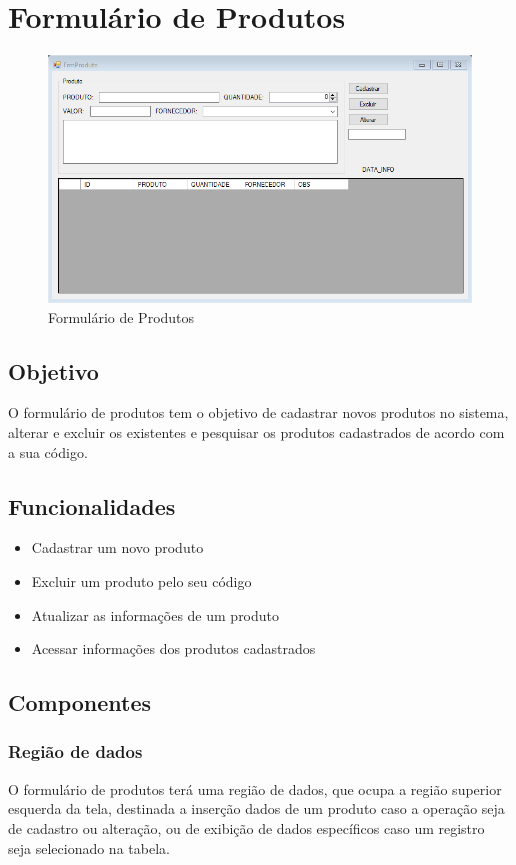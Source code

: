 \documentclass[
	article,			%
	12pt,				%
	oneside,			%
	a4paper,			%
	english,			%
	brazil,				%
	sumario=tradicional
	]{abntex2}
\begin{document}
	\section{Formulário de Produtos}
		\begin{figure}[!htb]
			\centering
			\includegraphics[scale=0.7]{./Figuras/FrmProduto.png}
			\caption{Formulário de Produtos}
		\end{figure}
		\subsection{Objetivo}
		O formulário de produtos tem o objetivo de cadastrar novos produtos no sistema, alterar e excluir os existentes e pesquisar os produtos cadastrados de acordo com a sua código.
		\subsection{Funcionalidades}
			\begin{itemize}
				\item Cadastrar um novo produto
				\item Excluir um produto pelo seu código
				\item Atualizar as informações de um produto
				\item Acessar informações dos produtos cadastrados
			\end{itemize}
		\subsection{Componentes}
			\subsubsection{Região de dados}
			O formulário de produtos terá uma região de dados, que ocupa a região superior esquerda da tela, destinada a inserção dados de um produto caso a operação seja de cadastro ou alteração, ou de exibição de dados específicos caso um registro seja selecionado na tabela.
			
\end{document}
